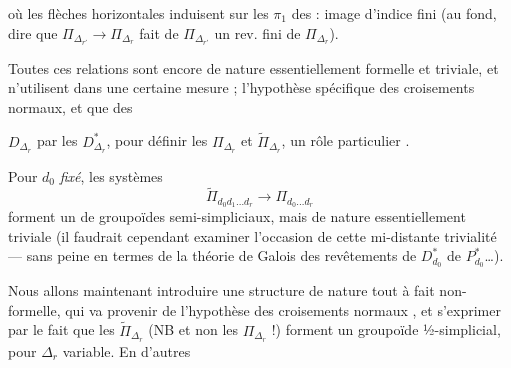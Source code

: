 \documentclass[11pt,a4paper]{article}
\begin{document}

où les flèches horizontales induisent \add{\ill{}} sur les $\pi_1$ des
 : \ill{} image d'indice fini (au fond, dire que
$\Pi_{\Delta_{r'}} \to \Pi_{\Delta_r}$ fait de $\Pi_{\Delta_{r'}}$ un rev. fini de
$\Pi_{\Delta_r}$).

Toutes ces relations sont encore de nature essentiellement formelle et
triviale, et n'utilisent dans une certaine mesure  ; \ill{}
l'hypothèse spécifique des croisements normaux, et  que
  des

$D_{\Delta_r}$ par les $D^{*}_{\Delta_r}$, pour définir les $\Pi_{\Delta_r}$ et
$\widetilde{\Pi}_{\Delta_r}$,   un rôle particulier
.

Pour $d_0$ \emph{fixé}, les systèmes
\[
  \widetilde{\Pi}_{d_0 d_1 \dots d_r} \longrightarrow \Pi_{d_0 \dots d_r}
\]
forment un  de groupoïdes semi-simpliciaux, mais de nature
essentiellement triviale (il faudrait cependant examiner l'occasion de
 cette mi-distante trivialité — 
sans peine en termes de la théorie de Galois des revêtements de $D^{*}_{d_0}$
 de $P^{*}_{d_0}$…).

Nous allons maintenant introduire une structure de nature tout à fait
non-formelle, qui va provenir de l'hypothèse des croisements normaux
, et s'exprimer par le fait que les $\widetilde{\Pi}_{\Delta_r}$
(NB et non les $\Pi_{\Delta_r}$ !) forment un groupoïde ½-simplicial, pour
$\Delta_r$ variable. En d'autres
\end{document}
